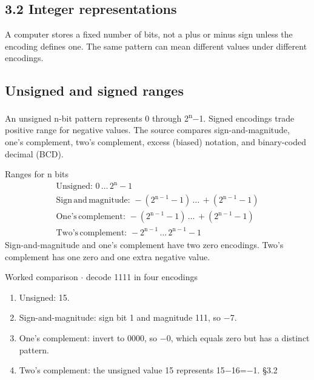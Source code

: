 \documentclass[11pt]{article}
\begin{document}
\begin{keepsection}
\section{3.2 Integer representations}

A computer stores a fixed number of bits, not a plus or minus sign unless the encoding defines one. The same pattern can mean different values under different encodings.

\begin{keepsection}
\subsection{Unsigned and signed ranges}

An unsigned n-bit pattern represents 0 through 2\textsuperscript{n}\ensuremath{-}1. Signed encodings trade positive range for negative values. The source compares sign-and-magnitude, one’s complement, two’s complement, excess (biased) notation, and binary-coded decimal (BCD).

\begin{equationcard}{Ranges for n bits}
\[ \begin{gathered} \text{Unsigned}:\, 0\, …\, 2^{\mathrm{n}}-1 \\ \text{Sign}\, \text{and}\, \text{magnitude}:\, -(2^{\mathrm{n}-1}-1)\, …\, +(2^{\mathrm{n}-1}-1) \\ \text{One}’\mathrm{s}\, \text{complement}:\, -(2^{\mathrm{n}-1}-1)\, …\, +(2^{\mathrm{n}-1}-1) \\ \text{Two}’\mathrm{s}\, \text{complement}:\, -2^{\mathrm{n}-1}\, …\, 2^{\mathrm{n}-1}-1 \end{gathered} \]
{\small Sign-and-magnitude and one’s complement have two zero encodings. Two’s complement has one zero and one extra negative value.}
\end{equationcard}

\begin{workedbox}{Worked comparison \ensuremath{\cdot} decode 1111 in four encodings}
\begin{enumerate}
\item Unsigned: 15.
\item Sign-and-magnitude: sign bit 1 and magnitude 111, so \ensuremath{-}7.
\item One’s complement: invert to 0000, so \ensuremath{-}0, which equals zero but has a distinct pattern.
\item Two’s complement: the unsigned value 15 represents 15\ensuremath{-}16=\ensuremath{-}1. \hfill{\small\color{FAUblue}§3.2}
\end{enumerate}
\end{workedbox}
\end{keepsection}


\end{keepsection}
\end{document}
